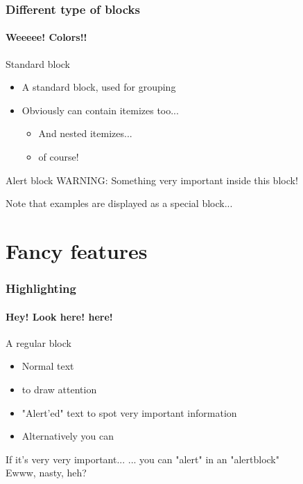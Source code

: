 \documentclass{article}
\begin{document}
\begin{frame}
  \frametitle{Different type of blocks}
  \framesubtitle{Weeeee! Colors!!}
  \begin{block}{Standard block}
  \begin{itemize}
    \item A standard block, used for grouping
    \item Obviously can contain itemizes too...
    \begin{itemize}
      \item And nested itemizes...
      \item of course!
    \end{itemize}
  \end{itemize}
  \end{block}
  \begin{alertblock}{Alert block}
  WARNING: Something very important inside this block!
  \end{alertblock}
  \begin{example}
  Note that examples are displayed as a special block...
  \end{example}
\end{frame}

\section{Fancy features}
\begin{frame}
  \frametitle{Highlighting}
  \framesubtitle{Hey! Look here! here!}

  \begin{block}{A regular block}
  \begin{itemize}
    \item Normal text
    \item {} to draw attention
    \item \alert{"Alert'ed" text} to spot very important information
    \item Alternatively you can
  \end{itemize}
  \end{block}
  \begin{alertblock}{If it's very very important...}
  \alert{... you can "alert" in an "alertblock"}\\
  Ewww, nasty, heh?
  \end{alertblock}
\end{frame}
\end{document}

